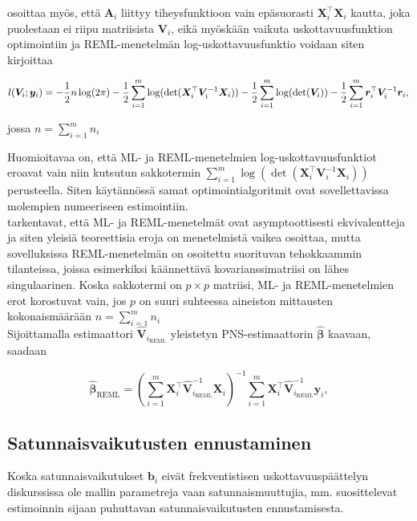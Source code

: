 \documentclass[finnish]{docopts}
\begin{document}
\cite{nissinen09} osoittaa myös, että $\bm{A}_i$ liittyy tiheysfunktioon vain epäsuorasti $\bm{X}_{i}^\top \bm{X}_i$ kautta, joka puolestaan ei riipu matriisista $\bm{V}_i$, eikä myöskään vaikuta uskottavuusfunktion optimointiin ja REML-menetelmän log-uskottavuusfunktio voidaan siten kirjoittaa

$$
l(\bm{V}_i;\bm{y}_i) = -\frac{1}{2} n \log (2\pi) -\frac{1}{2} \sum\limits_{i=1}^{m} \log (\det (\bm{X}_{i}^\top \bm{V}_{i}^{-1} \bm{X}_{i})) -\frac{1}{2} \sum\limits_{i=1}^{m} \log (\det (\bm{V}_{i})) -\frac{1}{2} \sum\limits_{i=1}^{m} \bm{r}_{i}^\top \bm{V}_i^{-1} \bm{r}_{i}, \\
$$

jossa $n = \sum\limits_{i=1}^{m} n_i$

Huomioitavaa on, että ML- ja REML-menetelmien log-uskottavuusfunktiot eroavat vain niin kutsutun sakkotermin $\sum\limits_{i=1}^{m} \log (\det (\bm{X}_{i}^\top \bm{V}_{i}^{-1} \bm{X}_{i}))$ perusteella. Siten käytännössä samat optimointialgoritmit ovat sovellettavissa molempien numeeriseen estimointiin. \\

\cite{diggle02} tarkentavat, että ML- ja REML-menetelmät ovat asymptoottisesti ekvivalentteja ja siten yleisiä teoreettisia eroja on menetelmistä vaikea osoittaa, mutta sovelluksissa REML-menetelmän on osoitettu suorituvan tehokkaammin tilanteissa, joissa esimerkiksi käännettävä kovarianssimatriisi on lähes singulaarinen. Koska sakkotermi on $p \times p$ matriisi, ML- ja REML-menetelmien erot korostuvat vain, jos $p$ on suuri suhteessa aineiston mittausten kokonaismäärään $n = \sum\limits_{i=1}^{m} n_i$ \\                                                                  

Sijoittamalla estimaattori $\hat{\bm{V}}_{i_{\text{REML}}}$ yleistetyn PNS-estimaattorin $\hat{\bm{\beta}}$ kaavaan, saadaan

$$
\hat{\bm{\beta}}_{\text{REML}} =  (\sum\limits_{i=1}^{m} \bm{X}_{i}^\top \hat{\bm{V}}_{i_{\text{REML}}}^{-1} \bm{X}_{i})^{-1} \sum\limits_{i=1}^{m} \bm{X}_{i}^\top \hat{\bm{V}}_{i_{\text{REML}}}^{-1} \bm{y}_i,
$$

\subsection{Satunnaisvaikutusten ennustaminen}
\label{sub:satunnaisvaik}

Koska satunnaisvaikutukset $\bm{b}_i$ eivät frekventistisen uskottavuuspäättelyn diskurssissa ole mallin parametreja vaan satunnaismuuttujia, mm. \cite{west14, pinheiro00} suosittelevat estimoinnin sijaan puhuttavan satunnaisvaikutusten ennustamisesta. \\
\end{document}
